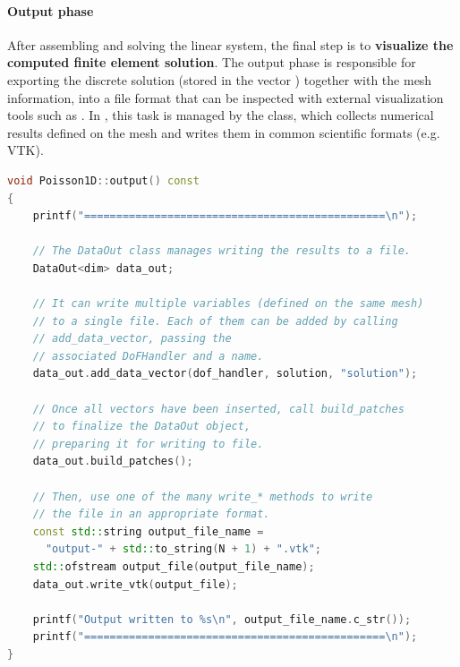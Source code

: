\paragraph{Output phase}

After assembling and solving the linear system, the final step is to \textbf{visualize the computed finite element solution}. The output phase is responsible for exporting the discrete solution (stored in the vector ) together with the mesh information, into a file format that can be inspected with external visualization tools such as . In , this task is managed by the  class, which collects numerical results defined on the mesh and writes them in common scientific formats (e.g. VTK).

\begin{lstlisting}[language=C++]
void Poisson1D::output() const
{
    printf("===============================================\n");

    // The DataOut class manages writing the results to a file.
    DataOut<dim> data_out;

    // It can write multiple variables (defined on the same mesh)
    // to a single file. Each of them can be added by calling
    // add_data_vector, passing the
    // associated DoFHandler and a name.
    data_out.add_data_vector(dof_handler, solution, "solution");

    // Once all vectors have been inserted, call build_patches
    // to finalize the DataOut object,
    // preparing it for writing to file.
    data_out.build_patches();

    // Then, use one of the many write_* methods to write
    // the file in an appropriate format.
    const std::string output_file_name =
      "output-" + std::to_string(N + 1) + ".vtk";
    std::ofstream output_file(output_file_name);
    data_out.write_vtk(output_file);

    printf("Output written to %s\n", output_file_name.c_str());
    printf("===============================================\n");
}\end{lstlisting}
